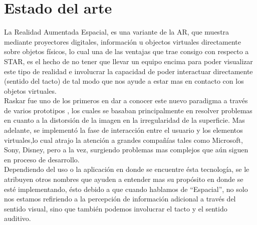 \documentclass[a4paper,openright,12pt]{report}
\begin{document}
\section{Estado del arte}
La Realidad Aumentada Espacial, es una variante de la AR, que muestra mediante proyectores digitales, información u objectos virtuales directamente sobre objetos físicos, lo cual una de las ventajas que trae consigo con respecto a STAR, es el hecho de no tener que llevar un equipo encima para poder visualizar este tipo de realidad e involucrar la capacidad de poder interactuar directamente (sentido del tacto) de tal modo que nos ayude a estar mas en contacto con los objetos virtuales.\\
Raskar fue uno de los primeros en dar a conocer este nuevo paradigma a través de varios prototipos \cite{Raskar1998a,Raskar1998b,Raskar2001}, los cuales se basaban principalmente en resolver problemas en cuanto a la distorsión de la imagen en la irregularidad de la superficie. Mas adelante, se implementó la fase de interacción entre el usuario y los elementos virtuales,lo cual atrajo la atención a grandes compañías tales como Microsoft, Sony, Disney, pero a la vez, surgiendo problemas mas complejos que aún siguen en proceso de desarrollo.\\ 
Dependiendo del uso o la aplicación en donde se encuentre ésta tecnología, se le atribuyen otros nombres que ayuden a entender mas su propósito en donde se esté implementando, ésto debido a que cuando hablamos de ``Espacial'', no solo nos estamos refiriendo a la percepción de información adicional a través del sentido visual, sino que también podemos involucrar el tacto y el sentido auditivo.\\ 
\end{document}
